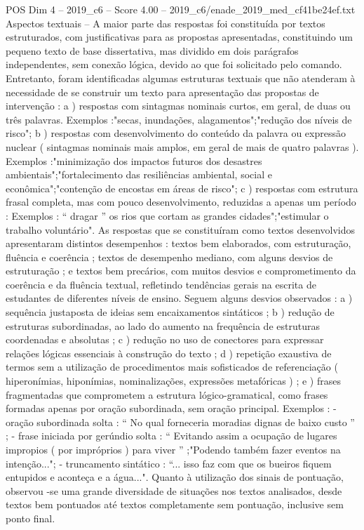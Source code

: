 \begin{textsample}{POS Dim 4 – 2019\_c6 – Score 4.00 – 2019\_c6/enade\_2019\_med\_cf41be24ef.txt}
Aspectos textuais – A maior parte das respostas foi constituída por textos estruturados, com justificativas para as propostas apresentadas, constituindo um pequeno texto de base dissertativa, mas dividido em dois parágrafos independentes, sem conexão lógica, devido ao que foi solicitado pelo comando.
Entretanto, foram identificadas algumas estruturas textuais que não atenderam à necessidade de se construir um texto para apresentação das propostas de intervenção : a ) respostas com sintagmas nominais curtos, em geral, de duas ou três palavras.
Exemplos :"secas, inundações, alagamentos";"redução dos níveis de risco"; b ) respostas com desenvolvimento do conteúdo da palavra ou expressão nuclear ( sintagmas nominais mais amplos, em geral de mais de quatro palavras ).
Exemplos :"minimização dos impactos futuros dos desastres ambientais";"fortalecimento das resiliências ambiental, social e econômica";"contenção de encostas em áreas de risco"; c ) respostas com estrutura frasal completa, mas com pouco desenvolvimento, reduzidas a apenas um período : Exemplos : “ dragar ” os rios que cortam as grandes cidades";"estimular o trabalho voluntário".
As respostas que se constituíram como textos desenvolvidos apresentaram distintos desempenhos : textos bem elaborados, com estruturação, fluência e coerência ; textos de desempenho mediano, com alguns desvios de estruturação ; e textos bem precários, com muitos desvios e comprometimento da coerência e da fluência textual, refletindo tendências gerais na escrita de estudantes de diferentes níveis de ensino.
Seguem alguns desvios observados : a ) sequência justaposta de ideias sem encaixamentos sintáticos ; b ) redução de estruturas subordinadas, ao lado do aumento na frequência de estruturas coordenadas e absolutas ; c ) redução no uso de conectores para expressar relações lógicas essenciais à construção do texto ; d ) repetição exaustiva de termos sem a utilização de procedimentos mais sofisticados de referenciação ( hiperonímias, hiponímias, nominalizações, expressões metafóricas ) ; e ) frases fragmentadas que comprometem a estrutura lógico-gramatical, como frases formadas apenas por oração subordinada, sem oração principal.
Exemplos : - oração subordinada solta : “ No qual forneceria moradias dignas de baixo custo ” ; - frase iniciada por gerúndio solta : “ Evitando assim a ocupação de lugares impropios ( por impróprios ) para viver ” ;"Podendo também fazer eventos na intenção..."; - truncamento sintático : “... isso faz com que os bueiros fiquem entupidos e aconteça e a água...".
Quanto à utilização dos sinais de pontuação, observou -se uma grande diversidade de situações nos textos analisados, desde textos bem pontuados até textos completamente sem pontuação, inclusive sem ponto final.

\end{textsample}
